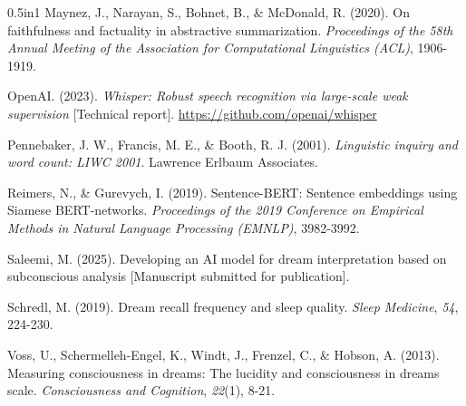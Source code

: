 \documentclass[12pt,a4paper]{report}
\begin{document}
\begin{hangparas}{0.5in}{1}
Maynez, J., Narayan, S., Bohnet, B., \& McDonald, R. (2020). On faithfulness and factuality in abstractive summarization. \textit{Proceedings of the 58th Annual Meeting of the Association for Computational Linguistics (ACL)}, 1906-1919.\par
OpenAI. (2023). \textit{Whisper: Robust speech recognition via large-scale weak supervision} [Technical report]. \url{https://github.com/openai/whisper}\par
Pennebaker, J. W., Francis, M. E., \& Booth, R. J. (2001). \textit{Linguistic inquiry and word count: LIWC 2001}. Lawrence Erlbaum Associates.\par
Reimers, N., \& Gurevych, I. (2019). Sentence-BERT: Sentence embeddings using Siamese BERT-networks. \textit{Proceedings of the 2019 Conference on Empirical Methods in Natural Language Processing (EMNLP)}, 3982-3992.\par
Saleemi, M. (2025). Developing an AI model for dream interpretation based on subconscious analysis [Manuscript submitted for publication].\par
Schredl, M. (2019). Dream recall frequency and sleep quality. \textit{Sleep Medicine}, \textit{54}, 224-230.\par
Voss, U., Schermelleh-Engel, K., Windt, J., Frenzel, C., \& Hobson, A. (2013). Measuring consciousness in dreams: The lucidity and consciousness in dreams scale. \textit{Consciousness and Cognition}, \textit{22}(1), 8-21.\par
\end{hangparas}
\end{document}

